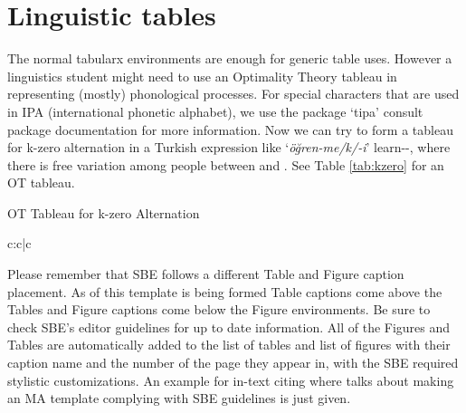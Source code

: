 \section{Linguistic tables}

The normal tabularx environments are enough for generic table uses. However a linguistics student might need to use an Optimality Theory tableau in representing (mostly) phonological processes. For special characters that are used in IPA (international phonetic alphabet), we use the package `tipa' consult package documentation for more information. Now we can try to form a tableau for k-zero alternation in a Turkish expression like `\textit{öğren-me/k/-i}' learn-{\Inf}-{\Acc}, where there is free variation among people between  and . See Table \ref{tab:kzero} for an OT tableau.

\begin{table}[hbt!]
    \caption{OT Tableau for k-zero Alternation}
    \vspace{10pt}
    \centering
    \begin{tableau}{c:c|c}
          
         \vio{*!} \vio{}
         \vio{} \vio{*}
         \vio{} \vio{}
    \end{tableau}

    \label{tab:kzero}
\end{table}

Please remember that SBE follows a different Table and Figure caption placement. As of this template is being formed Table captions come above the Tables and Figure captions come below the Figure environments. Be sure to check SBE's editor guidelines for up to date information. All of the Figures and Tables are automatically added to the list of tables and list of figures with their caption name and the number of the page they appear in, with the SBE required stylistic customizations. An example for in-text citing where \cite{atmaca2020} talks about making an MA template complying with SBE guidelines \citep{atmaca2020} is just given.

